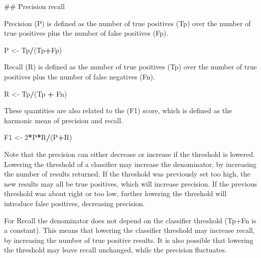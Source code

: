 \documentclass[
]{article}
\newenvironment{Shaded}{\begin{snugshade}}{\end{snugshade}}
\newcommand{\DecValTok}[1]{\textcolor[rgb]{0.00,0.00,0.81}{#1}}
\newcommand{\NormalTok}[1]{#1}
\newcommand{\OtherTok}[1]{\textcolor[rgb]{0.56,0.35,0.01}{#1}}
\newcommand{\SpecialCharTok}[1]{\textcolor[rgb]{0.81,0.36,0.00}{\textbf{#1}}}
\begin{document}
\newpage

\#\# Precision recall

Precision (P) is defined as the number of true positives (Tp) over the
number of true positives plus the number of false positives (Fp).

\begin{Shaded}
\begin{Highlighting}[]
\NormalTok{P }\OtherTok{\textless{}{-}}\NormalTok{ Tp}\SpecialCharTok{/}\NormalTok{(Tp}\SpecialCharTok{+}\NormalTok{Fp)}
\end{Highlighting}
\end{Shaded}

Recall (R) is defined as the number of true positives (Tp) over the
number of true positives plus the number of false negatives (Fn).

\begin{Shaded}
\begin{Highlighting}[]
\NormalTok{R }\OtherTok{\textless{}{-}}\NormalTok{ Tp}\SpecialCharTok{/}\NormalTok{(Tp }\SpecialCharTok{+}\NormalTok{ Fn)}
\end{Highlighting}
\end{Shaded}

These quantities are also related to the (F1) score, which is defined as
the harmonic mean of precision and recall.

\begin{Shaded}
\begin{Highlighting}[]
\NormalTok{F1 }\OtherTok{\textless{}{-}} \DecValTok{2}\SpecialCharTok{*}\NormalTok{P}\SpecialCharTok{*}\NormalTok{R}\SpecialCharTok{/}\NormalTok{(P}\SpecialCharTok{+}\NormalTok{R)}
\end{Highlighting}
\end{Shaded}

Note that the precision can either decrease or increase if the threshold
is lowered. Lowering the threshold of a classifier may increase the
denominator, by increasing the number of results returned. If the
threshold was previously set too high, the new results may all be true
positives, which will increase precision. If the previous threshold was
about right or too low, further lowering the threshold will introduce
false positives, decreasing precision.

For Recall the denominator does not depend on the classifier threshold
(Tp+Fn is a constant). This means that lowering the classifier threshold
may increase recall, by increasing the number of true positive results.
It is also possible that lowering the threshold may leave recall
unchanged, while the precision fluctuates.
\end{document}
